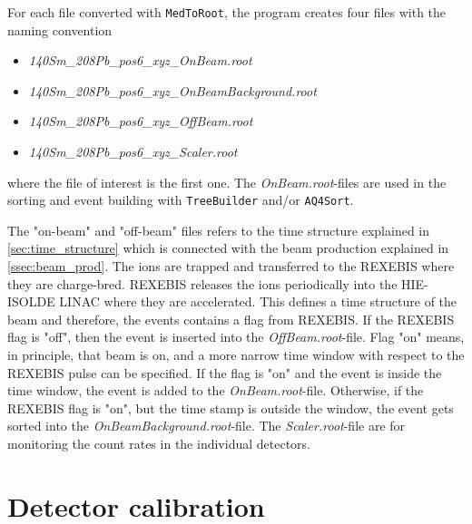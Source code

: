 \documentclass[twoside,english]{uiofysmaster/uiofysmaster}
\newcommand{\ga}{$\gamma$}
\let\orgautoref\autoref
\renewcommand{\autoref}
        {%
		 \def\sectionautorefname{Section}%
		 \def\subsectionautorefname{Section}%
		 \def\subsubsectionautorefname{Section}%
		 \def\chapterautorefname{Chapter}%
          \orgautoref}
\begin{document}
For each file converted with \texttt{MedToRoot}, the program creates four files with the naming convention
\begin{itemize}
	\item \textit{140Sm\_208Pb\_pos6\_xyz\_OnBeam.root} 
	\item \textit{140Sm\_208Pb\_pos6\_xyz\_OnBeamBackground.root}
	\item \textit{140Sm\_208Pb\_pos6\_xyz\_OffBeam.root}
	\item \textit{140Sm\_208Pb\_pos6\_xyz\_Scaler.root} 
\end{itemize}
where the file of interest is the first one. The \textit{OnBeam.root}-files are used in the sorting and event building with \texttt{TreeBuilder} and/or \texttt{AQ4Sort}.

The "on-beam" and "off-beam" files refers to the time structure explained in \autoref{sec:time_structure} which is connected with the beam production explained in \autoref{ssec:beam_prod}.
The ions are trapped and transferred to the REXEBIS where they are charge-bred.
REXEBIS releases the ions periodically into the HIE-ISOLDE LINAC where they are accelerated. 
This defines a time structure of the beam and therefore, the events contains a flag from REXEBIS.
If the REXEBIS flag is "off", then the event is inserted into the \textit{OffBeam.root}-file.
Flag "on" means, in principle, that beam is on, and a more narrow time window with respect to the REXEBIS pulse can be specified. 
If the flag is "on" and the event is inside the time window, the event is added to the \textit{OnBeam.root}-file.
Otherwise, if the REXEBIS flag is "on", but the time stamp is outside the window, the event gets sorted into the \textit{OnBeamBackground.root}-file.
The \textit{Scaler.root}-file are for monitoring the count rates in the individual detectors.



\section{Detector calibration}\label{sec:detector_cal}
\end{document}
